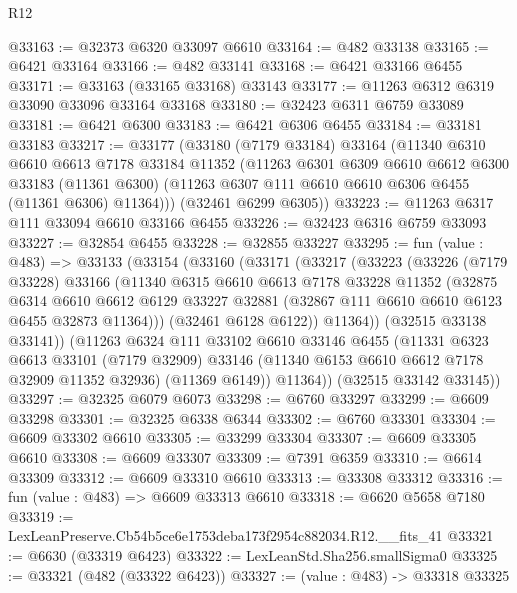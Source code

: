 \begin{lexlean}{R12}
\begin{coremodule}
@33163 := @32373 @6320 @33097 @6610
@33164 := @482 @33138
@33165 := @6421 @33164
@33166 := @482 @33141
@33168 := @6421 @33166 @6455
@33171 := @33163 (@33165 @33168) @33143
@33177 := @11263 @6312 @6319 @33090 @33096 @33164 @33168
@33180 := @32423 @6311 @6759 @33089
@33181 := @6421 @6300
@33183 := @6421 @6306 @6455
@33184 := @33181 @33183
@33217 := @33177
    (@33180
      (@7179 @33184)
      @33164
      (@11340
        @6310
        @6610
        @6613
        @7178
        @33184
        @11352
        (@11263
          @6301
          @6309
          @6610
          @6612
          @6300
          @33183
          (@11361 @6300)
          (@11263 @6307 @111 @6610 @6610 @6306 @6455 (@11361 @6306) @11364)))
      (@32461 @6299 @6305))
@33223 := @11263 @6317 @111 @33094 @6610 @33166 @6455
@33226 := @32423 @6316 @6759 @33093
@33227 := @32854 @6455
@33228 := @32855 @33227
@33295 := fun (value : @483) =>
  @33133
    (@33154
      (@33160
        (@33171
          (@33217
            (@33223
              (@33226
                (@7179 @33228)
                @33166
                (@11340
                  @6315
                  @6610
                  @6613
                  @7178
                  @33228
                  @11352
                  (@32875
                    @6314
                    @6610
                    @6612
                    @6129
                    @33227
                    @32881
                    (@32867 @111 @6610 @6610 @6123 @6455 @32873 @11364)))
                (@32461 @6128 @6122))
              @11364))
          (@32515 @33138 @33141))
        (@11263
          @6324
          @111
          @33102
          @6610
          @33146
          @6455
          (@11331
            @6323
            @6613
            @33101
            (@7179 @32909)
            @33146
            (@11340 @6153 @6610 @6612 @7178 @32909 @11352 @32936)
            (@11369 @6149))
          @11364))
      (@32515 @33142 @33145))
@33297 := @32325 @6079 @6073
@33298 := @6760 @33297
@33299 := @6609 @33298
@33301 := @32325 @6338 @6344
@33302 := @6760 @33301
@33304 := @6609 @33302 @6610
@33305 := @33299 @33304
@33307 := @6609 @33305 @6610
@33308 := @6609 @33307
@33309 := @7391 @6359
@33310 := @6614 @33309
@33312 := @6609 @33310 @6610
@33313 := @33308 @33312
@33316 := fun (value : @483) => @6609 @33313 @6610
@33318 := @6620 @5658 @7180
@33319 := LexLeanPreserve.Cb54b5ce6e1753deba173f2954c882034.R12.__fits_41
@33321 := @6630 (@33319 @6423)
@33322 := LexLeanStd.Sha256.smallSigma0
@33325 := @33321 (@482 (@33322 @6423))
@33327 := (value : @483) -> @33318 @33325

\end{coremodule}
\end{lexlean}
